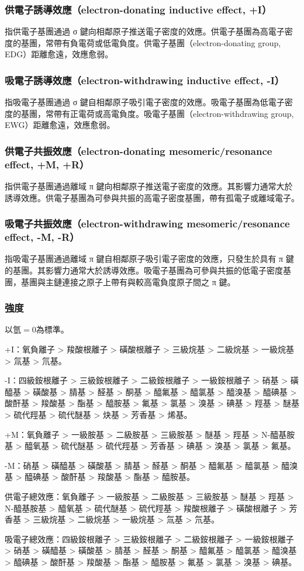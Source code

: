 \documentclass[a4paper,12pt]{report}
\begin{document}
\subsubsection{供電子誘導效應（electron-donating inductive effect, +I）}
指供電子基團通過 σ 鍵向相鄰原子推送電子密度的效應。供電子基團為高電子密度的基團，常帶有負電荷或低電負度。供電子基團（electron-donating group, EDG）距離愈遠，效應愈弱。
\subsubsection{吸電子誘導效應（electron-withdrawing inductive effect, -I）}
指吸電子基團通過 σ 鍵自相鄰原子吸引電子密度的效應。吸電子基團為低電子密度的基團，常帶有正電荷或高電負度。吸電子基團（electron-withdrawing group, EWG）距離愈遠，效應愈弱。
\subsubsection{供電子共振效應（electron-donating mesomeric/resonance effect, +M, +R）}
指供電子基團通過離域 π 鍵向相鄰原子推送電子密度的效應。其影響力通常大於誘導效應。供電子基團為可參與共振的高電子密度基團，帶有孤電子或離域電子。
\subsubsection{吸電子共振效應（electron-withdrawing mesomeric/resonance effect, -M, -R）}
指吸電子基團通過離域 π 鍵自相鄰原子吸引電子密度的效應，只發生於具有 π 鍵的基團。其影響力通常大於誘導效應。吸電子基團為可參與共振的低電子密度基團，基團與主鏈連接之原子上帶有與較高電負度原子間之 π 鍵。
\subsubsection{強度}
以氫$=0$為標準。
\bit
\item +I：氧負離子 > 羧酸根離子 > 磺酸根離子 > 三級烷基 > 二級烷基 > 一級烷基 > 氚基 > 氘基。
\item -I：四級銨根離子 > 三級銨根離子 > 二級銨根離子 > 一級銨根離子 > 硝基 > 磺醯基 > 磺酸基 > 腈基 > 醛基 > 酮基 > 醯氟基 > 醯氯基 > 醯溴基 > 醯碘基 > 酸酐基 > 羧酸基 > 酯基 > 醯胺基 > 氟基 > 氯基 > 溴基 > 碘基 > 羥基 > 醚基 > 硫代羥基 > 硫代醚基 > 炔基 > 芳香基 > 烯基。
\item +M：氧負離子 > 一級胺基 > 二級胺基 > 三級胺基 > 醚基 > 羥基 > N-醯基胺基 > 醯氧基 > 硫代醚基 > 硫代羥基 > 芳香基 > 碘基 > 溴基 > 氯基 > 氟基。
\item -M：硝基 > 磺醯基 > 磺酸基 > 腈基 > 醛基 > 酮基 > 醯氟基 > 醯氯基 > 醯溴基 > 醯碘基 > 酸酐基 > 羧酸基 > 酯基 > 醯胺基。
\item 供電子總效應：氧負離子 > 一級胺基 > 二級胺基 > 三級胺基 > 醚基 > 羥基 > N-醯基胺基 > 醯氧基 > 硫代醚基 > 硫代羥基 > 羧酸根離子 > 磺酸根離子 > 芳香基 > 三級烷基 > 二級烷基 > 一級烷基 > 氚基 > 氘基。
\item 吸電子總效應：四級銨根離子 > 三級銨根離子 > 二級銨根離子 > 一級銨根離子 > 硝基 > 磺醯基 > 磺酸基 > 腈基 > 醛基 > 酮基 > 醯氟基 > 醯氯基 > 醯溴基 > 醯碘基 > 酸酐基 > 羧酸基 > 酯基 > 醯胺基 > 氟基 > 氯基 > 溴基 > 碘基。
\eit
\end{document}
